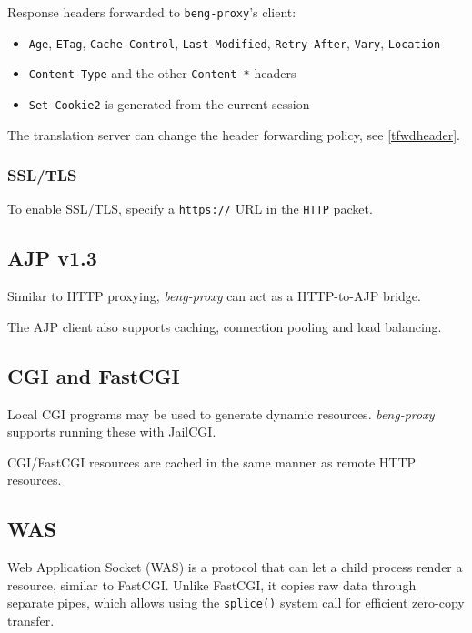 \documentclass[a4paper,12pt]{article}
\begin{document}
Response headers forwarded to \texttt{beng-proxy}'s client:

\begin{itemize}
\item \texttt{Age}, \texttt{ETag}, \texttt{Cache-Control},
  \texttt{Last-Modified}, \texttt{Retry-After}, \texttt{Vary},
  \texttt{Location}
\item \texttt{Content-Type} and the other \texttt{Content-*} headers
\item \texttt{Set-Cookie2} is generated from the current session
\end{itemize}

The translation server can change the header forwarding policy, see
\ref{tfwdheader}.

\subsubsection{SSL/TLS}

To enable SSL/TLS, specify a \texttt{https://} URL in the \verb|HTTP|
packet.

\subsection{AJP v1.3}
\label{ajp}

Similar to HTTP proxying, \emph{beng-proxy} can act as a HTTP-to-AJP
bridge.

The AJP client also supports caching, connection pooling and load
balancing.

\subsection{CGI and FastCGI}
\label{cgi}

Local CGI programs may be used to generate dynamic resources.
\emph{beng-proxy} supports running these with JailCGI.

CGI/FastCGI resources are cached in the same manner as remote HTTP
resources.

\subsection{WAS}
\label{was}

Web Application Socket (WAS) is a protocol that can let a child process
render a resource, similar to FastCGI.  Unlike FastCGI, it copies raw
data through separate pipes, which allows using the \texttt{splice()}
system call for efficient zero-copy transfer.
\end{document}
